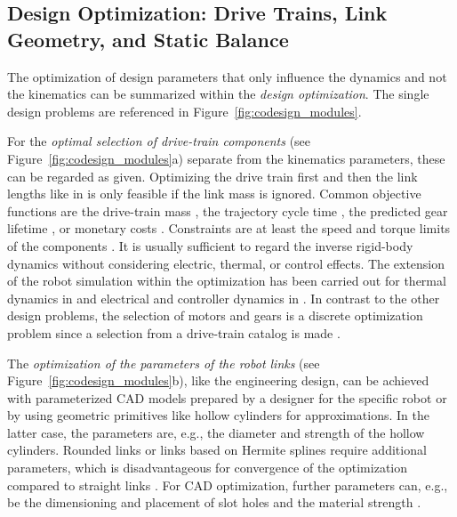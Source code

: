 \subsection{Design Optimization: Drive Trains, Link Geometry, and Static Balance}
\label{sec:ds_soa_despar}
%

The optimization of design parameters that only influence the dynamics and not the kinematics can be summarized within the \emph{design optimization}.
%
The single design problems are referenced in Figure~\ref{fig:codesign_modules}.

For the \emph{optimal selection of drive-train components} (see Figure~\ref{fig:codesign_modules}a) separate from the kinematics parameters, these can be regarded as given. %
Optimizing the drive train first and then the link lengths like in \cite{ShillerSun1991} is only feasible if the link mass is ignored.
%
Common objective functions are the drive-train mass \cite{ChedmailGau1990,PetterssonOel2009,ZhouBaiHan2011}, the trajectory cycle time \cite{TarkianPerOelFen2011}, the predicted gear lifetime \cite{PetterssonAndKru2005}, or monetary costs \cite{PetterssonAndKru2005}.
%
Constraints are at least the speed and torque limits of the components \cite {ChedmailGau1990,PetterssonOel2009,ZhouBaiHan2011}.
It is usually sufficient to regard the inverse rigid-body dynamics without considering electric, thermal, or control effects.
The extension of the robot simulation within the optimization has been carried out for thermal dynamics in \cite{ChedmailGau1990} and electrical and controller dynamics in \cite{Padilla-GarciaCruRod2015}.
In contrast to the other design problems, the selection of motors and gears is a discrete optimization problem since a selection from a drive-train catalog is made \cite{PetterssonAndKru2005}.

The \emph{optimization of the parameters of the robot links} (see Figure~\ref{fig:codesign_modules}b), like the engineering design, can be achieved with parameterized CAD models prepared by a designer for the specific robot \cite{TarkianPerOelFen2011,ZhouBai2015} or by using geometric primitives like hollow cylinders \cite{Prause2016,Ramirez2018,WangZhaCheHua2017} for approximations.
%
In the latter case, the parameters are, e.g., the diameter and strength of the hollow cylinders.
Rounded links or links based on Hermite splines require additional parameters, which is disadvantageous for convergence of the optimization compared to straight links  \cite{PastorBobHucGru2021}.
For CAD optimization, further parameters can, e.g., be the dimensioning and placement of slot holes \cite{ZhouBai2015} and the material strength \cite{TarkianPerOelFen2011}.

